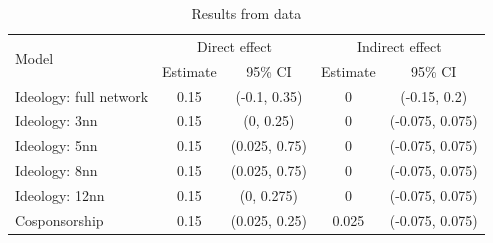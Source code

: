 \documentclass[12pt]{article}
\begin{document}
\begin{table}[h]
\centering
\begin{tabular}{lcccc}
\toprule
\multirow{2}{*}{Model} & \multicolumn{2}{c}{Direct effect} & \multicolumn{2}{c}{Indirect effect} \\
\cmidrule(l){2-3} \cmidrule(l){4-5}
 & Estimate & 95\% CI & Estimate & 95\% CI \\
\midrule
Ideology: full network  & 0.15 & (-0.1, 0.35) &  0 & (-0.15, 0.2)\\
Ideology: 3nn & 0.15 & (0, 0.25) & 0 & (-0.075, 0.075)\\
Ideology: 5nn & 0.15 & (0.025, 0.75) & 0 & (-0.075, 0.075)\\
Ideology: 8nn & 0.15 & (0.025, 0.75) & 0 & (-0.075, 0.075)\\
Ideology: 12nn & 0.15 & (0, 0.275) & 0 & (-0.075, 0.075)\\
Cosponsorship & 0.15 & (0.025, 0.25) & 0.025 & (-0.075, 0.075)\\
\bottomrule
\end{tabular}
\caption{Results from \citet{bergan2015call} data}
\end{table}


\end{document}
